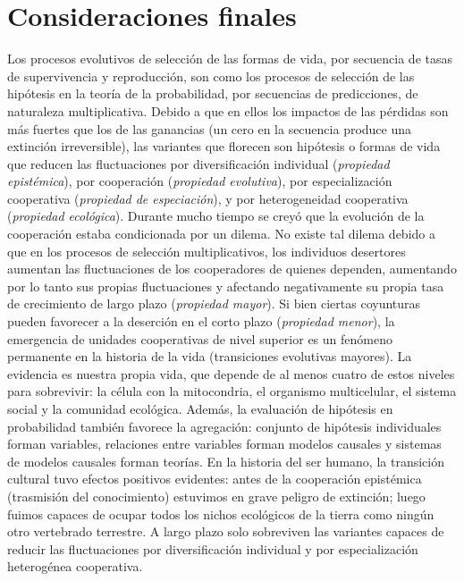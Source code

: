 \documentclass[a4paper,11pt]{book}
\theoremstyle{definition}
\begin{document}
\section{Consideraciones finales}

Los procesos evolutivos de selecci\'on de las formas de vida, por secuencia de tasas de supervivencia y reproducci\'on, son como los procesos de selecci\'on de las hip\'otesis en la teor\'ia de la probabilidad, por secuencias de predicciones, de naturaleza multiplicativa.
%
Debido a que en ellos los impactos de las p\'erdidas son m\'as fuertes que los de las ganancias (un cero en la secuencia produce una extinci\'on irreversible), las variantes que florecen son hip\'otesis o formas de vida que reducen las fluctuaciones por diversificaci\'on individual (\emph{propiedad epist\'emica}), por cooperaci\'on (\emph{propiedad evolutiva}), por especializaci\'on cooperativa (\emph{propiedad de especiaci\'on}), y por heterogeneidad cooperativa (\emph{propiedad ecol\'ogica}).
%
Durante mucho tiempo se crey\'o que la evoluci\'on de la cooperaci\'on estaba condicionada por un dilema.
%
No existe tal dilema debido a que en los procesos de selecci\'on multiplicativos, los individuos desertores aumentan las fluctuaciones de los cooperadores de quienes dependen, aumentando por lo tanto sus propias fluctuaciones y afectando negativamente su propia tasa de crecimiento de largo plazo (\emph{propiedad mayor}).
%
Si bien ciertas coyunturas pueden favorecer a la deserci\'on en el corto plazo (\emph{propiedad menor}), la emergencia de unidades cooperativas de nivel superior es un fen\'omeno permanente en la historia de la vida (transiciones evolutivas mayores).
%
La evidencia es nuestra propia vida, que depende de al menos cuatro de estos niveles para sobrevivir: la c\'elula con la mitocondria, el organismo multicelular, el sistema social y la comunidad ecol\'ogica.
%
Adem\'as, la evaluaci\'on de hip\'otesis en probabilidad tambi\'en favorece la agregaci\'on: conjunto de hip\'otesis individuales forman variables, relaciones entre variables forman modelos causales y sistemas de modelos causales forman teor\'ias.
%
En la historia del ser humano, la transici\'on cultural tuvo efectos positivos evidentes: antes de la cooperaci\'on epist\'emica (trasmisi\'on del conocimiento) estuvimos en grave peligro de extinci\'on; luego fuimos capaces de ocupar todos los nichos ecol\'ogicos de la tierra como ning\'un otro vertebrado terrestre.
%
A largo plazo solo sobreviven las variantes capaces de reducir las fluctuaciones por diversificaci\'on individual y por especializaci\'on heterog\'enea cooperativa.
\end{document}
